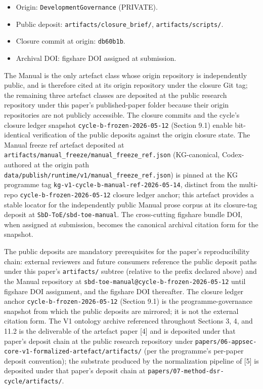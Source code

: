 \documentclass[
]{article}
\providecommand{\tightlist}{%
  \setlength{\itemsep}{0pt}\setlength{\parskip}{0pt}}
\begin{document}
\begin{itemize}
  \begin{itemize}
  \tightlist
  \item
    Origin: \texttt{DevelopmentGovernance} (PRIVATE).
  \item
    Public deposit: \texttt{artifacts/closure\_brief/},
    \texttt{artifacts/scripts/}.
  \item
    Closure commit at origin: \texttt{db60b1b}.
  \item
    Archival DOI: figshare DOI assigned at submission.
  \end{itemize}
\end{itemize}

The Manual is the only artefact class whose origin repository is
independently public, and is therefore cited at its origin repository
under the closure Git tag; the remaining three artefact classes are
deposited at the public research repository under this paper's
published-paper folder because their origin repositories are not
publicly accessible. The closure commits and the cycle's closure ledger
snapshot \texttt{cycle-b-frozen-2026-05-12} (Section 9.1) enable
bit-identical verification of the public deposits against the origin
closure state. The Manual freeze ref artefact deposited at
\texttt{artifacts/manual\_freeze/manual\_freeze\_ref.json}
(KG-canonical, Codex-authored at the origin path
\texttt{data/publish/runtime/v1/manual\_freeze\_ref.json}) is pinned at
the KG programme tag \texttt{kg-v1-cycle-b-manual-ref-2026-05-14},
distinct from the multi-repo \texttt{cycle-b-frozen-2026-05-12} closure
ledger anchor; this artefact provides a stable locator for the
independently public Manual prose corpus at its closure-tag deposit at
\texttt{SbD-ToE/sbd-toe-manual}. The cross-cutting figshare bundle DOI,
when assigned at submission, becomes the canonical archival citation
form for the snapshot.

The public deposits are mandatory prerequisites for the paper's
reproducibility chain: external reviewers and future consumers reference
the public deposit paths under this paper's \texttt{artifacts/} subtree
(relative to the prefix declared above) and the Manual repository at
\texttt{sbd-toe-manual@cycle-b-frozen-2026-05-12} until figshare DOI
assignment, and the figshare DOI thereafter. The closure ledger anchor
\texttt{cycle-b-frozen-2026-05-12} (Section 9.1) is the
programme-governance snapshot from which the public deposits are
mirrored; it is not the external citation form. The V1 ontology archive
referenced throughout Sections 3, 4, and 11.2 is the deliverable of the
artefact paper {[}4{]} and is deposited under that paper's deposit chain
at the public research repository under
\texttt{papers/06-appsec-core-v1-formalized-artefact/artifacts/} (per
the programme's per-paper deposit convention); the substrate produced by
the normalization pipeline of {[}5{]} is deposited under that paper's
deposit chain at \texttt{papers/07-method-dsr-cycle/artifacts/}.
\end{document}
